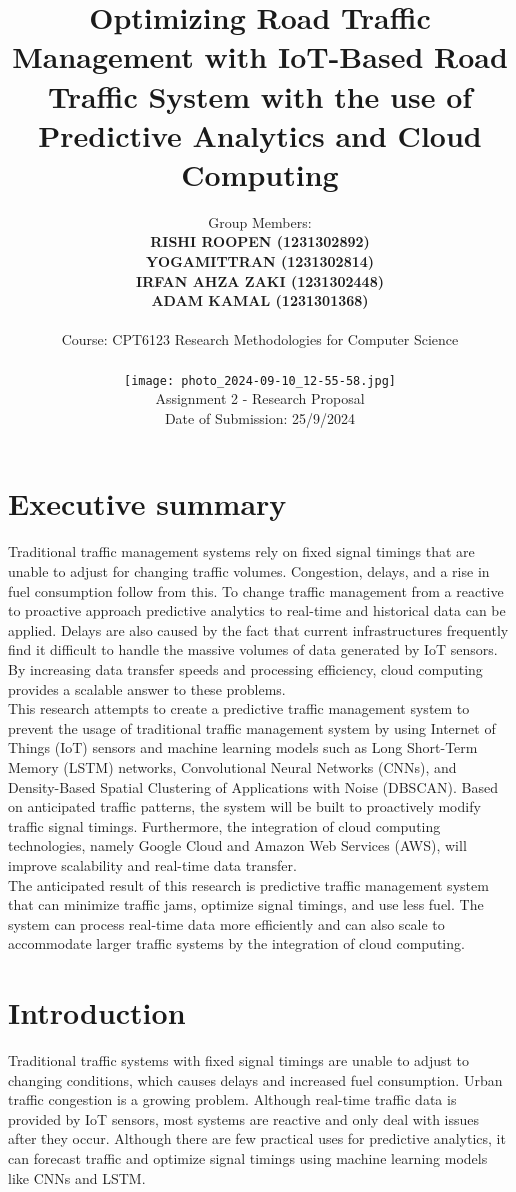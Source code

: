 \documentclass[12pt,a4paper]{article}
\title{Optimizing Road Traffic Management with IoT-Based Road Traffic System with the use of Predictive Analytics and Cloud Computing }
\author{Group Members: \\
\textbf{RISHI ROOPEN (1231302892)} \\
\textbf{YOGAMITTRAN (1231302814)} \\
\textbf{IRFAN AHZA ZAKI (1231302448)} \\
\textbf{ADAM KAMAL (1231301368)} \\
\\
Course: CPT6123 Research Methodologies for Computer Science \\
\begin{figure}
    \centering
    \texttt{[image: photo\_2024-09-10\_12-55-58.jpg]}
    \caption{Enter Caption}
    \label{fig:enter-label}
\end{figure}
Assignment 2 - Research Proposal \\
Date of Submission: 25/9/2024}
\date{}
\begin{document}
\maketitle
\newpage

\tableofcontents
\newpage

\section{Executive summary }
    
    Traditional traffic management systems rely on fixed signal timings that are unable to adjust for changing traffic volumes. Congestion, delays, and a rise in fuel consumption follow from this. To change traffic management from a reactive to proactive approach predictive analytics to real-time and historical data can be applied. Delays are also caused by the fact that current infrastructures frequently find it difficult to handle the massive volumes of data generated by IoT sensors. By increasing data transfer speeds and processing efficiency, cloud computing provides a scalable answer to these problems. \\

This research attempts to create a predictive traffic management system to prevent the usage of traditional traffic management system by using Internet of Things (IoT) sensors and machine learning models such as Long Short-Term Memory (LSTM) networks, Convolutional Neural Networks (CNNs), and Density-Based Spatial Clustering of Applications with Noise (DBSCAN). Based on anticipated traffic patterns, the system will be built to proactively modify traffic signal timings. Furthermore, the integration of cloud computing technologies, namely Google Cloud and Amazon Web Services (AWS), will improve scalability and real-time data transfer.\\

The anticipated result of this research is predictive traffic management system that can minimize traffic jams, optimize signal timings, and use less fuel. The system can process real-time data more efficiently and can also scale to accommodate larger traffic systems by the integration of  cloud computing.  

\newpage



\section{Introduction}
Traditional traffic systems with fixed signal timings are unable to adjust to changing conditions, which causes delays and increased fuel consumption. Urban traffic congestion is a growing problem. Although real-time traffic data is provided by IoT sensors, most systems are reactive and only deal with issues after they occur. Although there are few practical uses for predictive analytics, it can forecast traffic and optimize signal timings using machine learning models like CNNs and LSTM.\\ 
\end{document}
